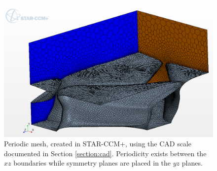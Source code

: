 \documentclass[12pt,oneside,a4paper]{article}
\begin{document}
\begin{figure}[!b]
\centering
\includegraphics[width=12cm]{images/starccm_periodic_mesh.png}
\caption{Periodic mesh, created in STAR-CCM+, using the CAD scale documented in Section \ref{section:cad}. Periodicity exists between the $xz$ boundaries while symmetry planes are placed in the $yz$ planes.}
\label{figure:periodicDomain}
\end{figure}
\end{document}
